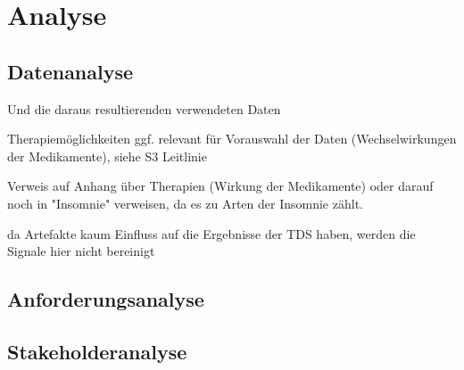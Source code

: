 \chapter{Analyse}

\section{Datenanalyse}

Und die daraus resultierenden verwendeten Daten

Therapiemöglichkeiten ggf. relevant für Vorauswahl der Daten (Wechselwirkungen der Medikamente), siehe S3 Leitlinie

Verweis auf Anhang über Therapien (Wirkung der Medikamente) oder darauf noch in "Insomnie" verweisen, da es zu Arten der Insomnie zählt.

da Artefakte kaum Einfluss auf die Ergebnisse der TDS haben, werden die Signale hier nicht bereinigt

\section{Anforderungsanalyse}

\section{Stakeholderanalyse}